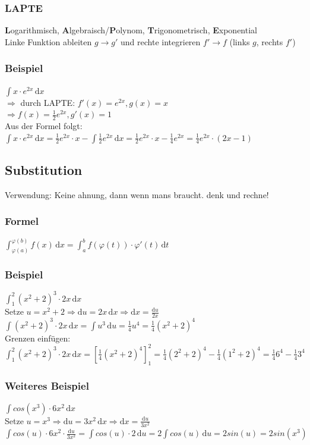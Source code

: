\documentclass[a4paper,portrait]{scrartcl}
\begin{document}
\subsubsection*{LAPTE}
\textbf{L}ogarithmisch, \textbf{A}lgebraisch/\textbf{P}olynom, \textbf{T}rigonometrisch, \textbf{E}xponential \\
Linke Funktion ableiten $g \rightarrow g'$ und rechte integrieren $f'\rightarrow f$ (links $g$, rechts $f'$)
\subsubsection*{Beispiel}
$ \int \! x \cdot e^{2x} \, \mathrm{d}x$ \\
$\Rightarrow$ durch LAPTE: $f'(x) = e^{2x}, g(x) = x$ \\
$\Rightarrow f(x) = \frac{1}{2} e^{2x}, g'(x) = 1 $  \\
Aus der Formel folgt: 
$ \int \! x \cdot e^{2x} \, \mathrm{d}x = \frac{1}{2} e^{2x} \cdot x - \int \! \frac{1}{2} e^{2x} \, \mathrm{d}x = \frac{1}{2} e^{2x} \cdot x - \frac{1}{4} e^{2x} = \frac{1}{4} e^{2x} \cdot (2x-1)$
\subsection{Substitution}
Verwendung: Keine ahnung, dann wenn mans braucht. denk und rechne!
\subsubsection*{Formel}
$ \int_{\varphi(a)}^{\varphi(b)} \! f(x) \,\mathrm{d}x = \int_{a}^{b} \! f(\varphi(t)) \cdot \varphi'(t) \,\mathrm{d}t$
\subsubsection*{Beispiel}
$ \int_{1}^{2} \!(x^2+2)^3 \cdot 2x \,\mathrm{d}x $ \\
Setze $ u = x^2 + 2 \Rightarrow \mathrm{d}u = 2x \,\mathrm{d}x \Rightarrow \mathrm{d}x = \frac{\mathrm{d}u}{2x}$ \\
$ \int \!(x^2+2)^3 \cdot 2x \,\mathrm{d}x = \int \! u^3 \,\mathrm{d}u = \frac{1}{4}u^4 = \frac{1}{4}(x^2+2)^4$ \\
Grenzen einfügen: $ \int_{1}^{2} \!(x^2+2)^3 \cdot 2x \,\mathrm{d}x = \left[ \frac{1}{4}(x^2+2)^4 \right]_1^2 = \frac{1}{4}(2^2+2)^4 - \frac{1}{4}(1^2+2)^4 = \frac{1}{4}6^4 - \frac{1}{4}3^4$
\subsubsection*{Weiteres Beispiel}
$ \int \!cos(x^3) \cdot 6x^2 \,\mathrm{d}x $ \\
Setze $ u = x^3 \Rightarrow \mathrm{d}u = 3x^2 \,\mathrm{d}x \Rightarrow \mathrm{d}x = \frac{\mathrm{d}u}{3x^2}$ \\
$ \int \!cos(u) \cdot 6x^2 \cdot \frac{\mathrm{d}u}{3x^2} = \int \!cos(u) \cdot 2 \,\mathrm{d}u = 2 \int \!cos(u) \,\mathrm{d}u = 2 sin(u) = 2 sin(x^3)$
\end{document}
